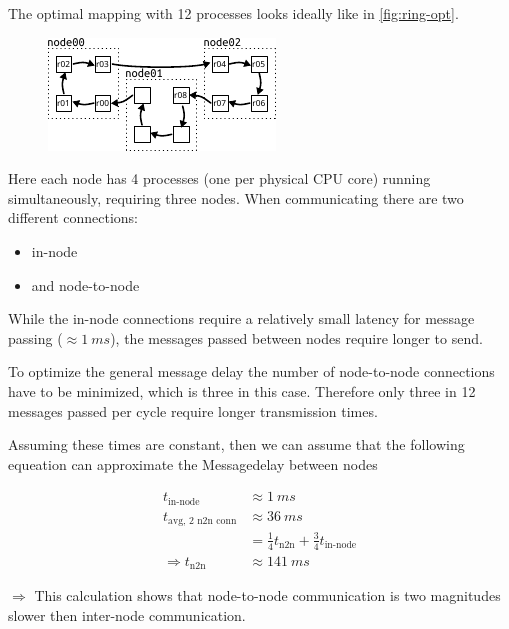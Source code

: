 \documentclass[]{scrartcl}
\begin{document}
The optimal mapping with 12 processes looks ideally like in \autoref{fig:ring-opt}.

\begin{figure}[H]
    \centering
    \includegraphics[width=.5\columnwidth]{img/ring-opt.pdf}
    \caption{}%
    \label{fig:ring-opt}
\end{figure}

Here each node has 4 processes (one per physical CPU core) running simultaneously, requiring three nodes.
When communicating there are two different connections:
\begin{itemize}
    \item in-node
    \item and node-to-node
\end{itemize}

While the in-node connections require a relatively small latency for message passing ($\approx \SI{1}{ms}$), the messages passed between nodes require longer to send.

To optimize the general message delay the number of node-to-node connections have to be minimized, which is three in this case.
Therefore only three in 12 messages passed per cycle require longer transmission times.

Assuming these times are constant, then we can assume that the following equeation can approximate the Messagedelay between nodes

\begin{align}
t_\text{in-node} &\approx \SI{1}{ms}\\
t_\text{avg, 2 n2n conn} &\approx \SI{36}{ms}\\
                         &=\frac 14 t_\text{n2n} + \frac 34 t_\text{in-node}\\
\Rightarrow t_\text{n2n} &\approx \SI{141}{ms}
\end{align}

$\Rightarrow$ This calculation shows that node-to-node communication is two magnitudes slower then inter-node communication.
\end{document}
